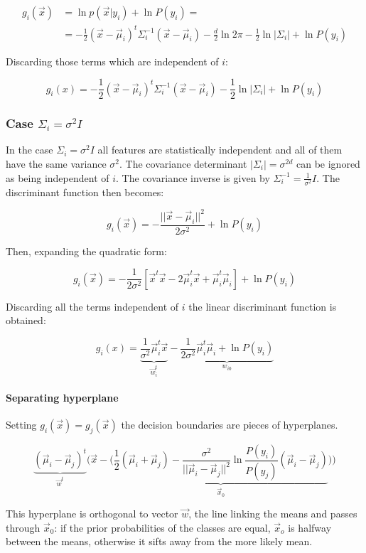 	\begin{align*}
		g_i(\vec{x}) &= \ln p(\vec{x}|y_i) + \ln P(y_i)=\\
								 &=-\frac{1}{2}(\vec{x}-\vec{\mu}_i)^t\Sigma_i^{-1}(\vec{x}-\vec{\mu}_i) - \frac{d}{2}\ln 2\pi - \frac{1}{2}\ln|\Sigma_i| + \ln P(y_i)
	\end{align*}

	Discarding those terms which are independent of $i$:

	$$g_i(x) = -\frac{1}{2}(\vec{x}-\vec{\mu}_i)^t\Sigma_i^{-1}(\vec{x}-\vec{\mu}_i)-\frac{1}{2}\ln|\Sigma_i| + \ln P(y_i)$$

		\subsubsection{Case $\Sigma_i = \sigma^2 I$}
		In the case $\Sigma_i = \sigma^2 I$ all features are statistically independent and all of them have the same variance $\sigma^2$.
		The covariance determinant $|\Sigma_i| = \sigma^{2d}$ can be ignored as being independent of $i$.
		The covariance inverse is given by $\Sigma_i^{-1} = \frac{1}{\sigma^2}I$.
		The discriminant function then becomes:

		$$g_i(\vec{x}) = -\frac{||\vec{x}-\vec{\mu}_i||^2}{2\sigma^2} + \ln P(y_i)$$

		Then, expanding the quadratic form:

		$$g_i(\vec{x}) = -\frac{1}{2\sigma^2}[\vec{x}^t\vec{x}-2\vec{\mu}_i^t\vec{x} + \vec{\mu}_i^t\vec{\mu}_i] + \ln P(y_i)$$

		Discarding all the terms independent of $i$ the linear discriminant function is obtained:

		$$g_i(x) = \underbrace{\frac{1}{\sigma^2}\vec{\mu}_i^t\vec{x}}_{\vec{w}_i^t} - \underbrace{\frac{1}{2\sigma^2}\vec{\mu}_i^t\vec{\mu}_i + \ln P(y_i)}_{w_{i0}}$$

			\paragraph{Separating hyperplane}
			Setting $g_i(\vec{x}) = g_j(\vec{x})$ the decision boundaries are pieces of hyperplanes.

			$$\underbrace{(\vec{\mu}_i - \vec{\mu}_j)^t}_{\vec{w}^t}\biggl(\vec{x}-\biggl(\underbrace{\frac{1}{2}(\vec{\mu}_i + \vec{\mu}_j) - \frac{\sigma^2}{||\vec{\mu}_i-\vec{\mu}_j||^2}\ln\frac{P(y_i)}{P(y_j)}(\vec{\mu}_i-\vec{\mu}_j)}_{\vec{x}_0}\biggr)\biggr)$$

			This hyperplane is orthogonal to vector $\vec{w}$, the line linking the means and passes through $\vec{x}_0$: if the prior probabilities of the classes are equal, $\vec{x}_o$ is halfway between the means, otherwise it sifts away from the more likely mean.

